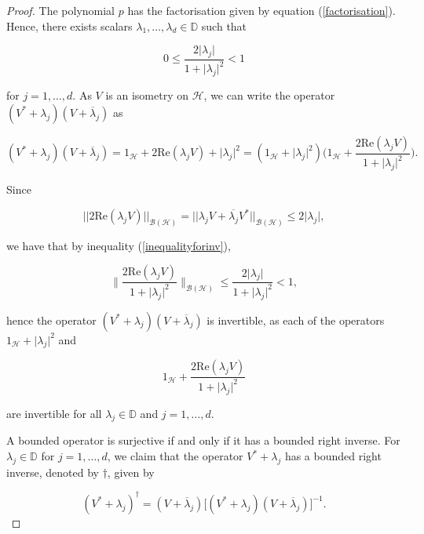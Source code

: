 \documentclass[10pt,a4paper]{amsart}
\begin{document}
\begin{proof}
The polynomial $p$ has the factorisation given by equation (\ref{factorisation}). Hence, there exists scalars $\lambda_{1},\hdots,\lambda_{d}\in\mathbb{D}$ such that

\begin{equation}\label{inequalityforinv}
0\leq \dfrac{2\lvert\lambda_{j}\rvert}{1+\lvert\lambda_{j}\rvert^{2}}<1
\end{equation}

\noindent for $j=1,\hdots,d$. As $V$ is an isometry on $\mathcal{H}$, we can write the operator $(V^{*}+\lambda_{j})(V+\overline{\lambda}_{j})$ as

$$
    (V^{*}+\lambda_{j})(V+\overline{\lambda}_{j}) = 1_{\mathcal{H}} + 2\mathrm{Re}(\lambda_{j} V) + \lvert \lambda_{j} \rvert^{2} =(1_{\mathcal{H}}+\lvert\lambda_{j}\rvert^{2})\bigg(1_{\mathcal{H}}+\dfrac{2\mathrm{Re}(\lambda_{j} V)}{1+\lvert\lambda_{j}\rvert^{2}}\bigg).$$

\noindent Since

$$ || 2\mathrm{Re}(\lambda_{j} V) ||_{\mathcal{B}(\mathcal{H})} = || \lambda_{j} V + \overline{\lambda_{j}} V^{*} ||_{\mathcal{B}(\mathcal{H})} \leq 2 \lvert\lambda_{j} \rvert, $$

\noindent we have that by inequality (\ref{inequalityforinv}), 

\begin{equation}\label{inequalityforinv2}
\Bigg\|\dfrac{2\mathrm{Re}(\lambda_{j} V)}{1+\lvert\lambda_{j}\rvert^{2}}\Bigg\|_{\mathcal{B}(\mathcal{H})}\leq \dfrac{2\lvert\lambda_{j}\rvert}{1+\lvert\lambda_{j}\rvert^{2}} < 1,
\end{equation}

\noindent hence the operator $(V^{*}+\lambda_{j})(V+\overline{\lambda}_{j})$ is invertible, as each of the operators $1_{\mathcal{H}}+\lvert\lambda_{j}\rvert^{2}$ and

$$ 1_{\mathcal{H}}+\dfrac{2\mathrm{Re}(\lambda_{j} V)}{1+\lvert\lambda_{j}\rvert^{2}}$$ 

\noindent are invertible for all $\lambda_{j}\in\mathbb{D}$ and $j=1,\hdots,d$.

 A bounded operator is surjective if and only if it has a bounded right inverse. For $\lambda_{j}\in\mathbb{D}$ for $j=1,\hdots,d$, we claim that the operator $V^{*}+\lambda_{j}$ has a bounded right inverse, denoted by $\dagger$, given by


$$(V^{*}+\lambda_{j})^{\dagger}=(V+\overline{\lambda}_{j})\bigg[(V^{*}+\lambda_{j})(V+\overline{\lambda}_{j})\bigg]^{-1}.$$


\end{proof}
\end{document}
